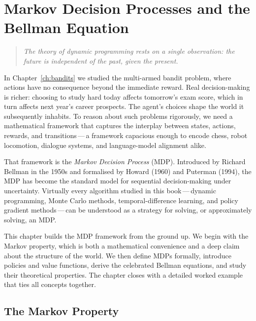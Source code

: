 \chapter[MDPs and the Bellman Equation]{Markov Decision Processes and the Bellman Equation}
\label{ch:mdp}

\begin{quote}
\itshape
The theory of dynamic programming rests on a single observation: the future is independent of the past, given the present.
\end{quote}

\bigskip

In Chapter~\ref{ch:bandits} we studied the multi-armed bandit problem, where actions have no consequence beyond the immediate reward. Real decision-making is richer: choosing to study hard today affects tomorrow's exam score, which in turn affects next year's career prospects. The agent's choices shape the world it subsequently inhabits. To reason about such problems rigorously, we need a mathematical framework that captures the interplay between states, actions, rewards, and transitions\,---\,a framework capacious enough to encode chess, robot locomotion, dialogue systems, and language-model alignment alike.

That framework is the \emph{Markov Decision Process} (MDP). Introduced by Richard Bellman in the 1950s and formalised by Howard (1960) and Puterman (1994), the MDP has become the standard model for sequential decision-making under uncertainty. Virtually every algorithm studied in this book\,---\,dynamic programming, Monte Carlo methods, temporal-difference learning, and policy gradient methods\,---\,can be understood as a strategy for solving, or approximately solving, an MDP.

This chapter builds the MDP framework from the ground up. We begin with the Markov property, which is both a mathematical convenience and a deep claim about the structure of the world. We then define MDPs formally, introduce policies and value functions, derive the celebrated Bellman equations, and study their theoretical properties. The chapter closes with a detailed worked example that ties all concepts together.


\section{The Markov Property}
\label{sec:markov-property}

